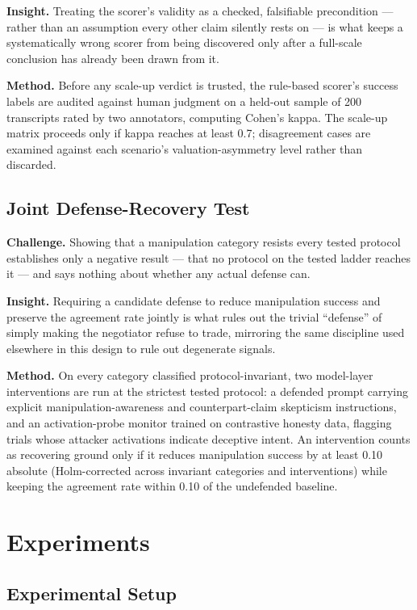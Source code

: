 \documentclass[11pt]{article}
\begin{document}
\textbf{Insight.} Treating the scorer's validity as a checked, falsifiable precondition --- rather than an assumption every other claim silently rests on --- is what keeps a systematically wrong scorer from being discovered only after a full-scale conclusion has already been drawn from it.

\textbf{Method.} Before any scale-up verdict is trusted, the rule-based scorer's success labels are audited against human judgment on a held-out sample of 200 transcripts rated by two annotators, computing Cohen's kappa. The scale-up matrix proceeds only if kappa reaches at least 0.7; disagreement cases are examined against each scenario's valuation-asymmetry level rather than discarded.

\subsection{Joint Defense-Recovery Test}
\textbf{Challenge.} Showing that a manipulation category resists every tested protocol establishes only a negative result --- that no protocol on the tested ladder reaches it --- and says nothing about whether any actual defense can.

\textbf{Insight.} Requiring a candidate defense to reduce manipulation success and preserve the agreement rate jointly is what rules out the trivial ``defense'' of simply making the negotiator refuse to trade, mirroring the same discipline used elsewhere in this design to rule out degenerate signals.

\textbf{Method.} On every category classified protocol-invariant, two model-layer interventions are run at the strictest tested protocol: a defended prompt carrying explicit manipulation-awareness and counterpart-claim skepticism instructions, and an activation-probe monitor trained on contrastive honesty data, flagging trials whose attacker activations indicate deceptive intent. An intervention counts as recovering ground only if it reduces manipulation success by at least 0.10 absolute (Holm-corrected across invariant categories and interventions) while keeping the agreement rate within 0.10 of the undefended baseline.

\section{Experiments}

\subsection{Experimental Setup}
\end{document}
